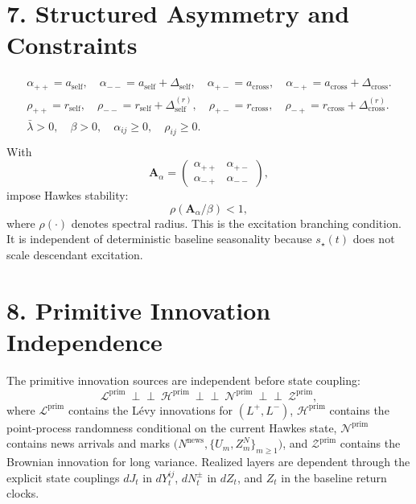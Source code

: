 \documentclass[11pt]{article}
\begin{document}
    \section*{7. Structured Asymmetry and Constraints}
    \begin{gather*}
        \alpha_{++}=a_{\mathrm{self}},
        \quad
        \alpha_{--}=a_{\mathrm{self}}+\Delta_{\mathrm{self}},
        \quad
        \alpha_{+-}=a_{\mathrm{cross}},
        \quad
        \alpha_{-+}=a_{\mathrm{cross}}+\Delta_{\mathrm{cross}}.\\
        \rho_{++}=r_{\mathrm{self}},
        \quad
        \rho_{--}=r_{\mathrm{self}}+\Delta^{(r)}_{\mathrm{self}},
        \quad
        \rho_{+-}=r_{\mathrm{cross}},
        \quad
        \rho_{-+}=r_{\mathrm{cross}}+\Delta^{(r)}_{\mathrm{cross}}.\\
        \bar{\lambda}>0,\quad
        \beta>0,\quad
        \alpha_{ij}\ge 0,\quad
        \rho_{ij}\ge 0.\\
    \end{gather*}
    With
    \[
        \mathbf{A}_{\alpha}=
        \begin{pmatrix}
            \alpha_{++} & \alpha_{+-}\\
            \alpha_{-+} & \alpha_{--}
        \end{pmatrix},
    \]
    impose Hawkes stability:
    \[
        \rho\!\left(\mathbf{A}_{\alpha}/\beta\right)<1,
    \]
    where \(\rho(\cdot)\) denotes spectral radius.
    This is the excitation branching condition.
    It is independent of deterministic baseline seasonality because \(s_\star(t)\)
    does not scale descendant excitation.

    \section*{8. Primitive Innovation Independence}
    The primitive innovation sources are independent before state coupling:
    \[
        \mathcal{L}^{\mathrm{prim}}\ \perp\!\!\!\perp\ \mathcal{H}^{\mathrm{prim}}\ \perp\!\!\!\perp\ \mathcal{N}^{\mathrm{prim}}\ \perp\!\!\!\perp\ \mathcal{Z}^{\mathrm{prim}},
    \]
    where \(\mathcal{L}^{\mathrm{prim}}\) contains the Lévy innovations for
    \((L^+,L^-)\), \(\mathcal{H}^{\mathrm{prim}}\) contains the point-process
    randomness conditional on the current Hawkes state, \(\mathcal{N}^{\mathrm{prim}}\)
    contains news arrivals and marks \(\big(N^{\mathrm{news}},\{U_m,Z_m^N\}_{m\ge1}\big)\),
    and \(\mathcal{Z}^{\mathrm{prim}}\) contains the Brownian innovation for long variance.
    Realized layers are dependent through the explicit state couplings
    \(dJ_t\) in \(dY_t^{ij}\), \(dN_t^\pm\) in \(dZ_t\), and \(Z_t\) in the
    baseline return clocks.
\end{document}
